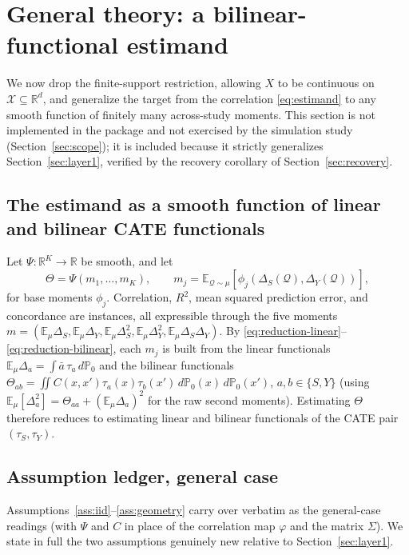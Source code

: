\documentclass[11pt]{article}
\theoremstyle{plain}
\theoremstyle{definition}
\theoremstyle{remark}
\newcommand{\E}{\mathbb{E}}
\newcommand{\PP}{\mathbb{P}}
\newcommand{\R}{\mathbb{R}}
\newcommand{\cX}{\mathcal{X}}
\newcommand{\Q}{\mathcal{Q}}
\begin{document}
\section{General theory: a bilinear-functional estimand}\label{sec:layer2}

We now drop the finite-support restriction, allowing $X$ to be continuous on
$\cX\subseteq\R^d$, and generalize the target from the correlation
\eqref{eq:estimand} to any smooth function of finitely many across-study moments.
This section is not implemented in the package and not exercised by the simulation
study (Section~\ref{sec:scope}); it is included because it strictly generalizes
Section~\ref{sec:layer1}, verified by the recovery corollary of
Section~\ref{sec:recovery}.

\subsection{The estimand as a smooth function of linear and bilinear CATE functionals}

Let $\Psi:\R^K\to\R$ be smooth, and let
\begin{equation}\label{eq:general-estimand}
    \Theta = \Psi(m_1,\dots,m_K), \qquad m_j = \E_{\Q\sim\mu}[\phi_j(\Delta_S(\Q),\Delta_Y(\Q))],
\end{equation}
for base moments $\phi_j$. Correlation, $R^2$, mean squared prediction error, and
concordance are instances, all expressible through the five moments
$m=(\E_\mu\Delta_S,\E_\mu\Delta_Y,\E_\mu\Delta_S^2,\E_\mu\Delta_Y^2,\E_\mu\Delta_S\Delta_Y)$.
By \eqref{eq:reduction-linear}--\eqref{eq:reduction-bilinear}, each $m_j$ is built from
the linear functionals $\E_\mu\Delta_a=\int\bar a\,\tau_a\,d\PP_0$ and the bilinear
functionals $\Theta_{ab}=\iint C(x,x')\tau_a(x)\tau_b(x')\,d\PP_0(x)\,d\PP_0(x')$,
$a,b\in\{S,Y\}$ (using $\E_\mu[\Delta_a^2]=\Theta_{aa}+(\E_\mu\Delta_a)^2$ for the raw
second moments). Estimating $\Theta$ therefore reduces to estimating linear and
bilinear functionals of the CATE pair $(\tau_S,\tau_Y)$.

\subsection{Assumption ledger, general case}

Assumptions~\ref{ass:iid}--\ref{ass:geometry} carry over verbatim as the general-case
readings (with $\Psi$ and $C$ in place of the correlation map $\varphi$ and the matrix
$\Sigma$). We state in full the two assumptions genuinely new relative to
Section~\ref{sec:layer1}.
\end{document}
